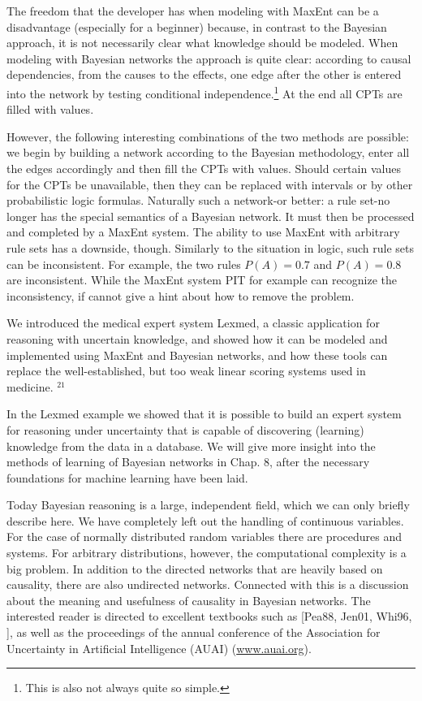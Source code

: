 \documentclass[10pt]{book}
\begin{document}
The freedom that the developer has when modeling with MaxEnt can be a disadvantage (especially for a beginner) because, in contrast to the Bayesian approach, it is not necessarily clear what knowledge should be modeled. When modeling with Bayesian networks the approach is quite clear: according to causal dependencies, from the causes to the effects, one edge after the other is entered into the network by testing conditional independence.\footnote{This is also not always quite so simple.} At the end all CPTs are filled with values.

However, the following interesting combinations of the two methods are possible: we begin by building a network according to the Bayesian methodology, enter all the edges accordingly and then fill the CPTs with values. Should certain values for the CPTs be unavailable, then they can be replaced with intervals or by other probabilistic logic formulas. Naturally such a network-or better: a rule set-no longer has the special semantics of a Bayesian network. It must then be processed and completed by a MaxEnt system.
The ability to use MaxEnt with arbitrary rule sets has a downside, though. Similarly to the situation in logic, such rule sets can be inconsistent. For example, the two rules $P(A)=0.7$ and $P(A)=0.8$ are inconsistent. While the MaxEnt system PIT for example can recognize the inconsistency, if cannot give a hint about how to remove the problem.

We introduced the medical expert system Lexmed, a classic application for reasoning with uncertain knowledge, and showed how it can be modeled and implemented using MaxEnt and Bayesian networks, and how these tools can replace the well-established, but too weak linear scoring systems used in medicine. ${ }^{21}$

In the Lexmed example we showed that it is possible to build an expert system for reasoning under uncertainty that is capable of discovering (learning) knowledge from the data in a database. We will give more insight into the methods of learning of Bayesian networks in Chap. 8, after the necessary foundations for machine learning have been laid.

Today Bayesian reasoning is a large, independent field, which we can only briefly describe here. We have completely left out the handling of continuous variables. For the case of normally distributed random variables there are procedures and systems. For arbitrary distributions, however, the computational complexity is a big problem. In addition to the directed networks that are heavily based on causality, there are also undirected networks. Connected with this is a discussion about the meaning and usefulness of causality in Bayesian networks. The interested reader is directed to excellent textbooks such as [Pea88, Jen01, Whi96, \cite{duda2001pattern}], as well as the proceedings of the annual conference of the Association for Uncertainty in Artificial Intelligence (AUAI) (\href{http://www.auai.org}{www.auai.org}).
\end{document}

